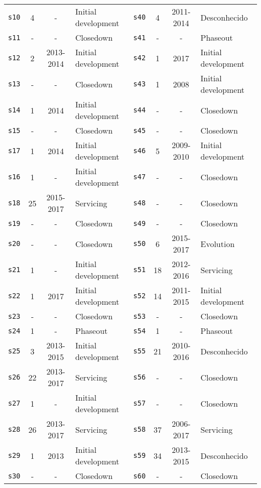 \begin{longtable}{ l c c l | l c c l }
      \texttt{s10} & 4 & - & Initial development &
        \texttt{s40} & 4 & 2011-2014 & Desconhecido  \\
      \texttt{s11} & - & - & Closedown &
        \texttt{s41} & - & - & Phaseout  \\
      \texttt{s12} & 2 & 2013-2014 & Initial development &
        \texttt{s42} & 1 & 2017 & Initial development  \\
      \texttt{s13} & - & - & Closedown &
        \texttt{s43} & 1 & 2008 & Initial development  \\
      \texttt{s14} & 1 & 2014 & Initial development &
        \texttt{s44} & - & - & Closedown  \\
      \texttt{s15} & - & - & Closedown &
        \texttt{s45} & - & - & Closedown  \\
      \texttt{s17} & 1 & 2014 & Initial development &
        \texttt{s46} & 5 & 2009-2010 & Initial development  \\
      \texttt{s16} & 1 & - & Initial development &
        \texttt{s47} & - & - & Closedown  \\
      \texttt{s18} & 25 & 2015-2017 & Servicing &
        \texttt{s48} & - & - & Closedown  \\
      \texttt{s19} & - & - & Closedown &
        \texttt{s49} & - & - & Closedown  \\
      \texttt{s20} & - & - & Closedown &
        \texttt{s50} & 6 & 2015-2017 & Evolution  \\
      \texttt{s21} & 1 & - & Initial development &
        \texttt{s51} & 18 & 2012-2016 & Servicing  \\
      \texttt{s22} & 1 & 2017 & Initial development &
        \texttt{s52} & 14 & 2011-2015 & Initial development  \\
      \texttt{s23} & - & - & Closedown &
        \texttt{s53} & - & - & Closedown  \\
      \texttt{s24} & 1 & - & Phaseout &
        \texttt{s54} & 1 & - & Phaseout  \\
      \texttt{s25} & 3 & 2013-2015 & Initial development &
        \texttt{s55} & 21 & 2010-2016 & Desconhecido  \\
      \texttt{s26} & 22 & 2013-2017 & Servicing &
        \texttt{s56} & - & - & Closedown  \\
      \texttt{s27} & 1 & - & Initial development &
        \texttt{s57} & - & - & Closedown  \\
      \texttt{s28} & 26 & 2013-2017 & Servicing &
        \texttt{s58} & 37 & 2006-2017 & Servicing  \\
      \texttt{s29} & 1 & 2013 & Initial development &
        \texttt{s59} & 34 & 2013-2015 & Desconhecido  \\
      \texttt{s30} & - & - & Closedown &
        \texttt{s60} & - & - & Closedown  \\
\end{longtable}
